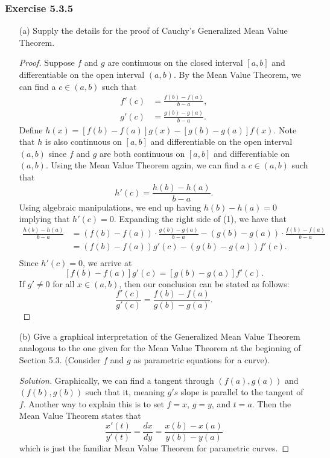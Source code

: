 \subsubsection{Exercise 5.3.5} 
\begin{enumerate}
    \item[(a)] Supply the details for the proof of Cauchy's Generalized Mean Value Theorem.
        \begin{proof}
            Suppose \( f  \) and \( g  \) are continuous on the closed interval \( [a,b]  \) and differentiable on the open interval \( (a,b)  \). By the Mean Value Theorem, we can find a \( c \in (a,b)  \) such that 
            \begin{align*}
                f'(c) &= \frac{ f(b) - f(a)  }{ b -a  },  \\
                g'(c) &= \frac{ g(b) - g(a)  }{ b -a  }.
            \end{align*}
            Define \( h(x)  = [f(b) -f(a) ] g(x) - [g(b) -g(a)] f(x)   \). Note that \( h  \) is also continuous on \( [a,b]  \) and differentiable on the open interval  \(  (a,b) \) since \( f  \) and \( g  \) are both continuous on \( [a,b]  \) and differentiable on \( (a,b)  \). Using the Mean Value Theorem again, we can find a \( c \in (a,b)  \) such that 
            \[  h'(c) = \frac{ h(b) - h(a)  }{ b - a  }. \tag{1}  \]
            Using algebraic manipulations, we end up having \( h(b) - h(a) = 0  \) implying that \( h'(c) = 0  \). Expanding the right side of (1), we have that 
            \begin{align*}
                \frac{ h(b) - h(a)  }{ b -a  } &= (f(b) -f(a)) \cdot \frac{  g(b) - g(a)}{ b - a }  - (g(b) - g(a)) \cdot \frac{f(b) - f(a)}{ b - a  }  \\
                                               &=  (f(b) - f(a)) g'(c) - (g(b) -g(a)) f'(c). \\
            \end{align*}
            Since \( h'(c) = 0  \), we arrive at 
            \[  [f(b) - f(a)] g'(c) = [g(b) - g(a)] f'(c). \]
            If \( g' \neq 0  \) for all \( x \in (a,b)  \), then our conclusion can be stated as follows:
            \[  \frac{ f'(c)  }{ g'(c)  } = \frac{ f(b) - f(a)  }{ g(b) - g(a)  }. \]
        \end{proof}
    \item[(b)] Give a graphical interpretation of the Generalized Mean Value Theorem analogous to the one given for the Mean Value Theorem at the beginning of Section 5.3. (Consider \( f  \) and \( g  \) as parametric equations for a curve).
        \begin{proof}[Solution]
        Graphically, we can find a tangent through \( (f(a) , g(a))  \) and \( (f(b) , g(b) ) \) such that it, meaning \( g's  \) slope is parallel to the tangent of \(  f   \). Another way to explain this is to set \( f = x  \), \( g = y  \), and \( t = a  \). Then the Mean Value Theorem states that 
        \[  \frac{ x'(t)  }{ y'(t)  } = \frac{d x }{d y } = \frac{ x(b) - x(a)  }{ y(b) - y(a)  }  \] which is just the familiar Mean Value Theorem for parametric curves.
        \end{proof}
\end{enumerate}


